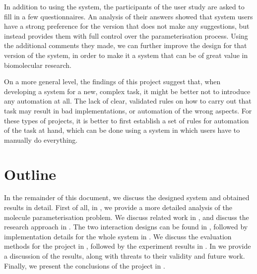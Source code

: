 In addition to using the system, the participants of the user study are asked to fill in a few questionnaires. An analysis of their answers showed that system users have a strong preference for the version that does not make any suggestions, but instead provides them with full control over the parameterisation process. Using the additional comments they made, we can further improve the design for that version of the system, in order to make it a system that can be of great value in biomolecular research.

On a more general level, the findings of this project suggest that, when developing a system for a new, complex task, it might be better not to introduce any automation at all. The lack of clear, validated rules on how to carry out that task may result in bad implementations, or automation of the wrong aspects. For these types of projects, it is better to first establish a set of rules for automation of the task at hand, which can be done using a system in which users have to manually do everything.



\section{Outline}
In the remainder of this document, we discuss the designed system and obtained results in detail. First of all, in , we provide a more detailed analysis of the molecule parameterisation problem. We discuss related work in , and discuss the research approach in . The two interaction designs can be found in , followed by implementation details for the whole system in . We discuss the evaluation methods for the project in , followed by the experiment results in . In  we provide a discussion of the results, along with threats to their validity and future work. Finally, we present the conclusions of the project in .
